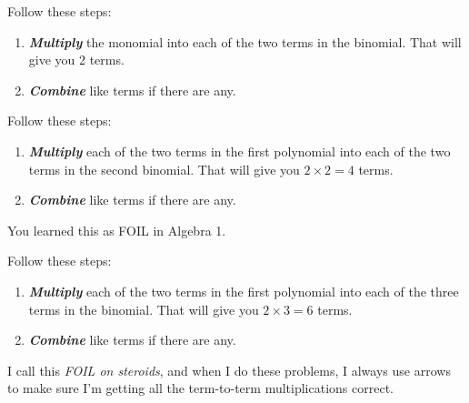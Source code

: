 \documentclass[fleqn,letterpaper,12pt,printwatermark=false]{memoir}
\begin{document}
\begin{myKeyConcepts}
    Follow these steps:
    \begin{enumerate}
        \item {\bfseries\itshape Multiply} the monomial
        into each of the two terms in the binomial. 
        That will give you 2 terms.
        \item {\bfseries\itshape Combine} like terms if there are any.
    \end{enumerate}
\end{myKeyConcepts}



\begin{myKeyConcepts}
    Follow these steps:
    \begin{enumerate}
        \item {\bfseries\itshape Multiply} each of the two terms in the first polynomial
        into each of the two terms in the second binomial. That will give you $2 \times 2=4$ terms.
        \item {\bfseries\itshape Combine} like terms if there are any.
    \end{enumerate}
    You learned this as FOIL in Algebra 1.
\end{myKeyConcepts}




\begin{myKeyConcepts}
    Follow these steps:
    \begin{enumerate}
        \item {\bfseries\itshape Multiply} each of the two terms in the first polynomial
        into each of the three terms in the binomial. That will give you $2 \times 3=6$ terms.
        \item {\bfseries\itshape Combine} like terms if there are any.
    \end{enumerate}
    I call this \emph{FOIL on steroids},
    and when I do these problems, I always use arrows to make sure 
    I'm getting all the term-to-term multiplications correct.
\end{myKeyConcepts} 
\end{document}
